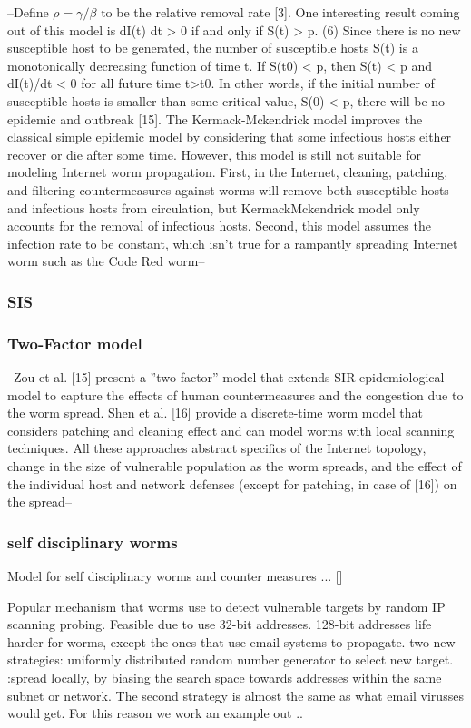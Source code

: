 --Define $\rho = \gamma/\beta$ to be the relative removal rate [3]. One
interesting result coming out of this model is
dI(t)
dt > 0 if and only if S(t) > p. (6)
Since there is no new susceptible host to be generated,
the number of susceptible hosts S(t) is a monotonically decreasing
function of time t. If S(t0) < p, then S(t) < p and
dI(t)/dt < 0 for all future time t>t0. In other words, if the
initial number of susceptible hosts is smaller than some critical
value, S(0) < p, there will be no epidemic and outbreak
[15].
The Kermack-Mckendrick model improves the classical
simple epidemic model by considering that some infectious
hosts either recover or die after some time. However, this
model is still not suitable for modeling Internet worm propagation.
First, in the Internet, cleaning, patching, and filtering
countermeasures against worms will remove both susceptible
hosts and infectious hosts from circulation, but KermackMckendrick
model only accounts for the removal of infectious
hosts. Second, this model assumes the infection rate
to be constant, which isn't true for a rampantly spreading
Internet worm such as the Code Red worm--
\subsubsection*{SIS}


\subsubsection{Two-Factor model}
--Zou et
al. [15] present a ''two-factor'' model that extends SIR
epidemiological model to capture the effects of human
countermeasures and the congestion due to the worm
spread. Shen et al. [16] provide a discrete-time worm
model that considers patching and cleaning effect and can
model worms with local scanning techniques. All these
approaches abstract specifics of the Internet topology,
change in the size of vulnerable population as the worm
spreads, and the effect of the individual host and network
defenses (except for patching, in case of [16]) on the
spread--
\subsubsection*{self disciplinary worms}
Model for self disciplinary worms and counter measures ... []

Popular mechanism that worms use to detect vulnerable targets by random IP scanning probing. Feasible due to use 32-bit addresses. 128-bit addresses life harder for worms, except the ones that use email systems to propagate. two new strategies: uniformly distributed random number generator to select new target. :spread locally, by biasing the search space towards addresses within the same subnet or network.  
The second strategy is almost the same as what email virusses would get. For this reason we work an example out .. 




